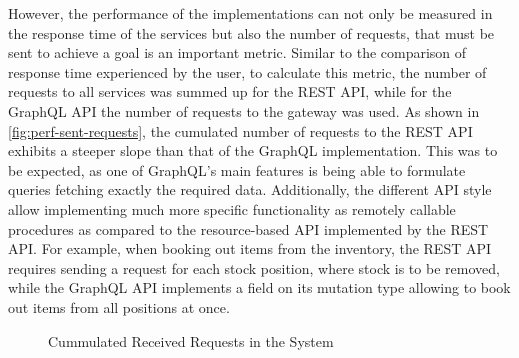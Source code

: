 However, the performance of the implementations can not only be measured in the response time of the services but also the number of requests, that must be sent to achieve a goal is an important metric.
Similar to the comparison of response time experienced by the user, to calculate this metric, the number of requests to all services was summed up for the \ac{REST} \ac{API}, while for the GraphQL \ac{API} the number of requests to the gateway was used.
As shown in \autoref{fig:perf-sent-requests}, the cumulated number of requests to the \ac{REST} \ac{API} exhibits a steeper slope than that of the GraphQL implementation.
This was to be expected, as one of GraphQL's main features is being able to formulate queries fetching exactly the required data.
Additionally, the different \ac{API} style allow implementing much more specific functionality as remotely callable procedures as compared to the resource-based \ac{API} implemented by the \ac{REST} \ac{API}.
For example, when booking out items from the inventory, the \ac{REST} \ac{API} requires sending a request for each stock position, where stock is to be removed, while the GraphQL \ac{API} implements a field on its mutation type allowing to book out items from all positions at once.

\begin{figure}[htb!]
    \centering
    \caption{Cummulated Received Requests in the System}\label{fig:perf-sent-requests}    
\end{figure}

